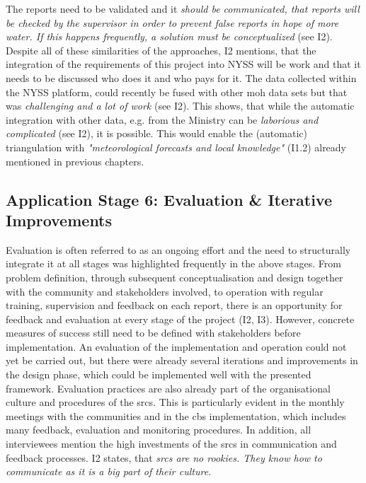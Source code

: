 The reports need to be validated and it \textit{should be communicated, that reports will be checked by the supervisor in order to prevent false reports in hope of more water. If this happens frequently, a solution must be conceptualized} (see I2). Despite all of these similarities of the approaches, I2 mentions, that the integration of the requirements of this project into NYSS will be work and that it needs to be discussed who does it and who pays for it.\newline
The data collected within the NYSS platform, could recently be fused with other \acrshort{moh} data sets but that was \textit{challenging and a lot of work} (see I2). This shows, that while the automatic integration with other data, e.g. from the Ministry can be \textit{laborious and complicated} (see I2), it is possible. This would enable the (automatic) triangulation with \textit{"meteorological forecasts and local knowledge"} (I1.2) already mentioned in previous chapters.

\subsection{Application Stage 6: Evaluation \& Iterative Improvements}

Evaluation is often referred to as an ongoing effort and the need to structurally integrate it at all stages was highlighted frequently in the above stages. From problem definition, through subsequent conceptualisation and design together with the community and stakeholders involved, to operation with regular training, supervision and feedback on each report, there is an opportunity for feedback and evaluation at every stage of the project (I2, I3). However, concrete measures of success still need to be defined with stakeholders before implementation. An evaluation of the implementation and operation could not yet be carried out, but there were already several iterations and improvements in the design phase, which could be implemented well with the presented framework.\newline
Evaluation practices are also already part of the organisational culture and procedures of the \acrshort{srcs}. This is particularly evident in the monthly meetings with the communities and in the \acrshort{cbs} implementation, which includes many feedback, evaluation and monitoring procedures. In addition, all interviewees mention the high investments of the \acrshort{srcs} in communication and feedback processes. I2 states, that \textit{\acrshort{srcs} are no rookies. They know how to communicate as it is a big part of their culture}.

